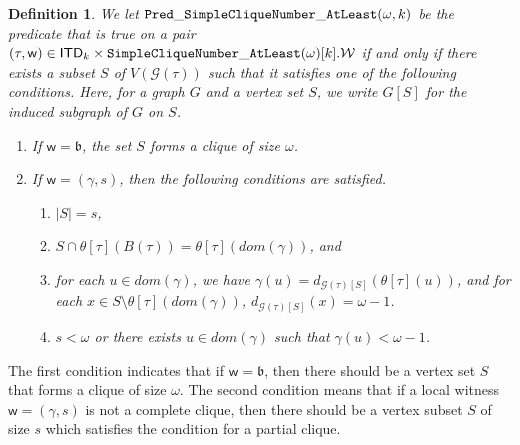 \documentclass[11pt,a4paper]{article}
\newtheorem{definition}[theorem]{Definition}
\newcommand{\treewidthvalue}{k}
\newcommand{\decompositiongraph}[1]{\mathcal{G}(#1)}
\newcommand{\vertexset}[1]{V(#1)}
\newcommand{\topbagname}{B}
\newcommand{\topbag}[1]{\topbagname(#1)}
\newcommand{\allabstractdecompositionstreewidth}[1]{\mathsf{ITD}_{#1}}
\newcommand{\abstractdecomposition}{\tau}
\newcommand{\vertexone}{u}
\newcommand{\allwitnesses}{\mathcal{W}}
\newcommand{\awitness}{\mathsf{w}}
\newcommand{\dpNamePart}[1]{\mbox{\normalfont\ttfamily #1}}
\newcommand{\simpleCliqueNumberAtLeastCore}[1]{\dpNamePart{SimpleCliqueNumber}\_\allowbreak\dpNamePart{AtLeast}(#1)}
\newcommand{\topmapname}{\theta}
\newcommand{\topmap}[1]{\topmapname[#1]}
\newcommand{\xvertex}{x}
\newcommand{\domain}{dom}
\newcommand{\cliqueparameter}{\omega}
\newcommand{\cliquemap}{\gamma}
\newcommand{\cliquesize}{s}
\newcommand{\cliquefound}{\mathfrak{b}}
\newcommand{\predicateSimpleCliqueNumberAtLeast}[2]{\dpNamePart{Pred}\_\allowbreak\dpNamePart{SimpleCliqueNumber}\_\allowbreak\dpNamePart{AtLeast}(#1,#2)}
\newcommand{\vertexsub}{S}
\newcommand{\vdegree}{d}
\begin{document}
{				\begin{definition}
					\label{definition:PredicateSimpleCliqueNumberAtLeast}
					We let $\predicateSimpleCliqueNumberAtLeast{\cliqueparameter}{\treewidthvalue}$ be the predicate that is true on a pair $(\abstractdecomposition,\awitness) \in \allabstractdecompositionstreewidth{\treewidthvalue}\times \simpleCliqueNumberAtLeastCore{\cliqueparameter}[\treewidthvalue].\allwitnesses$ if and only if there exists a subset $\vertexsub$ of $\vertexset{\decompositiongraph{\abstractdecomposition}}$ such that it satisfies one of the following conditions.
					Here, for a graph $G$ and a vertex set $S$, we write $G[S]$ for the induced subgraph of $G$ on $S$.
					\begin{enumerate}
						\item If $\awitness = \cliquefound$, the set $\vertexsub$ forms a clique of size $\cliqueparameter$.
						\item If $\awitness = (\cliquemap,\cliquesize)$, then the following conditions are satisfied.
						\begin{enumerate}
							\item $|\vertexsub| = \cliquesize$,
							\item $\vertexsub\cap \topmap{\abstractdecomposition}(\topbag{\abstractdecomposition}) = \topmap{\abstractdecomposition}(\domain(\cliquemap))$, and
							\item for each $\vertexone\in \domain(\cliquemap)$, we have $\cliquemap(\vertexone) = \vdegree_{\decompositiongraph{\abstractdecomposition}[\vertexsub]}(\topmap{\abstractdecomposition}(\vertexone))$, and for each $\xvertex\in \vertexsub\setminus \topmap{\abstractdecomposition}(\domain(\cliquemap))$, $\vdegree_{\decompositiongraph{\abstractdecomposition}[\vertexsub]}(\xvertex) = \cliqueparameter - 1$.
							\item $\cliquesize < \cliqueparameter$ or there exists $\vertexone\in \domain(\cliquemap)$ such that $\cliquemap(\vertexone) < \cliqueparameter-1$.
						\end{enumerate}
					\end{enumerate}
				\end{definition}

	The first condition indicates that if $\awitness = \cliquefound$, then there should be a vertex set $\vertexsub$ that forms a clique of size $\cliqueparameter$. The second condition means that if a local witness $\awitness = (\cliquemap,\cliquesize)$ is not a complete clique, then there should be a vertex subset $\vertexsub$ of size $\cliquesize$ which satisfies the condition for a partial clique.

}
\end{document}
